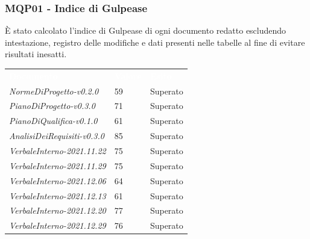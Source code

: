 \subsubsection{MQP01 - Indice di Gulpease}
È stato calcolato l'indice di Gulpease di ogni documento redatto escludendo intestazione, registro delle modifiche e dati presenti nelle tabelle al fine di evitare risultati inesatti.
\begin{table}[H]
        \renewcommand{\arraystretch}{1.5}
        \begin{tabular}{m{}<{\centering}  m{}<{\centering}  m{}<{\centering} }
            \rowcolor{darkblue}
            \textcolor{white}{\textbf{Documento}}& \textcolor{white}{\textbf{Valore}} & \textcolor{white}{\textbf{Esito}}\\ 
            
			\textit{NormeDiProgetto-v0.2.0} &
            59 &
            Superato \\

            \textit{PianoDiProgetto-v0.3.0} &
            71 &
            Superato \\

            \textit{PianoDiQualifica-v0.1.0} &
            61 &
            Superato \\

            \textit{AnalisiDeiRequisiti-v0.3.0} &
            85 &
            Superato \\

            \textit{VerbaleInterno-2021.11.22}&
            75 &
            Superato \\

            \textit{VerbaleInterno-2021.11.29}&
            75 &
            Superato \\
            
            \textit{VerbaleInterno-2021.12.06}&
            64 &
            Superato \\
            
            \textit{VerbaleInterno-2021.12.13}&
            61 &
            Superato \\
            
            \textit{VerbaleInterno-2021.12.20}&
            77 &
            Superato \\
            
            \textit{VerbaleInterno-2021.12.29}&
            76 &
            Superato \\
            

\end{tabular}
\end{table}

